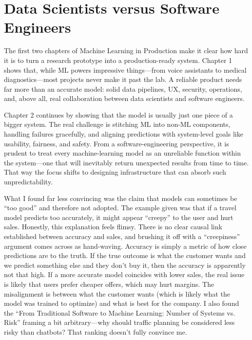 \documentclass[11pt,a4paper]{article}
\begin{document}
\section{Data Scientists versus Software Engineers}
The first two chapters of Machine Learning in Production make it clear how hard it is to turn a research prototype into a production-ready system. Chapter 1 shows that, while ML powers impressive things—from voice assistants to medical diagnostics—most projects never make it past the lab. A reliable product needs far more than an accurate model: solid data pipelines, UX, security, operations, and, above all, real collaboration between data scientists and software engineers.

Chapter 2 continues by showing that the model is usually just one piece of a bigger system. The real challenge is stitching ML into non-ML components, handling failures gracefully, and aligning predictions with system-level goals like usability, fairness, and safety. From a software-engineering perspective, it is prudent to treat every machine-learning model as an unreliable function within the system—one that will inevitably return unexpected results from time to time. That way the focus shifts to designing infrastructure that can absorb such unpredictability.

What I found far less convincing was the claim that models can sometimes be “too good” and therefore not adopted. The example given was that if a travel model predicts too accurately, it might appear “creepy” to the user and hurt sales. Honestly, this explanation feels flimsy. There is no clear causal link established between accuracy and sales, and brushing it off with a “creepiness” argument comes across as hand-waving. Accuracy is simply a metric of how close predictions are to the truth. If the true outcome is what the customer wants and we predict something else and they don’t buy it, then the accuracy is apparently not that high. If a more accurate model coincides with lower sales, the real issue is likely that users prefer cheaper offers, which may hurt margins. The misalignment is between what the customer wants (which is likely what the model was trained to optimize) and what is best for the company. I also found the “From Traditional Software to Machine Learning: Number of Systems vs. Risk” framing a bit arbitrary—why should traffic planning be considered less risky than chatbots? That ranking doesn’t fully convince me.
\end{document}
